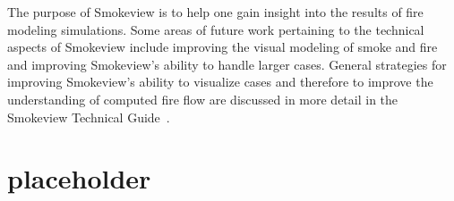 \documentclass[11pt,twoside]{book}
\begin{document}
The purpose of Smokeview is to help one gain insight into the results
of fire modeling simulations.
Some areas of future work pertaining to the technical aspects of
Smokeview include improving the visual modeling of smoke and fire
and improving Smokeview's ability to handle larger cases.
General strategies for improving Smokeview's ability to visualize
cases and therefore to improve the understanding of computed fire
flow are discussed in more detail in the
Smokeview Technical Guide~\cite{Smokeview_Tech_Guide}.






\appendix
{}


\chapter{placeholder}
\end{document}
